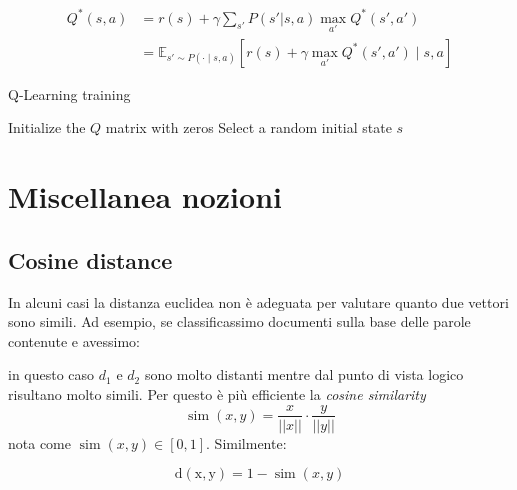 \begin{align*}
	Q^*(s, a) & = r(s) + \gamma \sum_{s'} P(s' | s, a) \max_{a'} Q^*(s', a')                                           \\
	          & = \mathbb{E}_{s' \sim P(\cdot \mid s, a)} \left[ r(s) + \gamma \max_{a'} Q^*(s', a') \mid s, a \right]
\end{align*}
\begin{algoritmo}{Q-Learning training}
	\begin{algorithm}[H]
		Initialize the $Q$ matrix with zeros\;
		Select a random initial state $s$\;
	\end{algorithm}
\end{algoritmo}







\newpage
\section{Miscellanea nozioni}
\subsection{Cosine distance}\label{cosine-distance}
In alcuni casi la distanza euclidea non è adeguata per valutare quanto due vettori sono simili. Ad esempio, se classificassimo documenti sulla base delle parole contenute e avessimo:

\begin{center}
\end{center}
in questo caso $ d_1 $ e $ d_2 $ sono molto distanti mentre dal punto di vista logico risultano molto simili. Per questo è più efficiente la \textit{cosine similarity}
\[
	\operatorname{sim} \left(x,y\right) = \frac{x}{\left|\left|x\right|\right|}\cdot  \frac{y}{\left|\left|y\right|\right|}
\]
nota come $ \operatorname{sim}\left(x,y\right) \in \left[0,1\right] $. Similmente:

\[
	\operatorname{d\left(x,y\right)} = 1 - \operatorname{sim}\left(x,y\right)
\]






